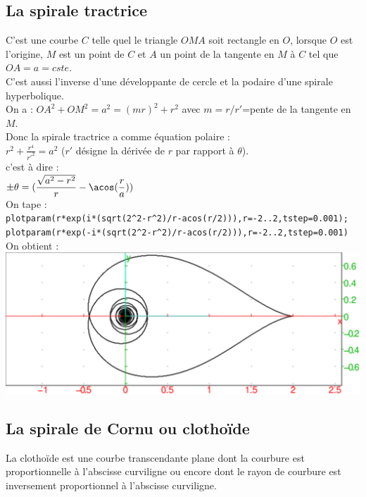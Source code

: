 \documentclass[a4paper,11pt]{book}
\begin{document}
\subsection{La spirale tractrice}
C'est une courbe $C$ telle quel le triangle $OMA$ soit rectangle en $O$,
lorsque $O$ est l'origine, $M$ est un point de $C$ et $A$ un point de la 
tangente en $M$ \`a $C$ tel que $OA=a=cste$.\\ 
C'est aussi l'inverse d'une d\'eveloppante de cercle et la podaire d'une 
spirale hyperbolique.\\
On a : $OA^2+OM^2=a^2=(mr)^2+r^2$ avec $m=r/r'$=pente de la tangente en $M$.\\
Donc la spirale tractrice a  comme \'equation polaire :\\
$\displaystyle r^2+\frac{r^4}{r'^2}=a^2$ ($r'$ d\'esigne la d\'eriv\'ee de $r$ 
par rapport \`a $\theta$).\\
c'est \`a dire :\\
$\displaystyle \pm \theta=(\frac{\sqrt{a^2-r^2}}{r}-\acos(\frac{r}{a})) $\\
On tape :\\
{\tt plotparam(r*exp(i*(sqrt(2\verb|^|2-r\verb|^|2)/r-acos(r/2))),r=-2..2,tstep=0.001);}\\
{\tt plotparam(r*exp(-i*(sqrt(2\verb|^|2-r\verb|^|2)/r-acos(r/2))),r=-2..2,tstep=0.001)}\\
On obtient :\\
\includegraphics[width=\textwidth]{spiral10}
\subsection{La spirale de Cornu ou clotho\"{i}de}
La clotho\"{i}de est une courbe transcendante plane dont la courbure est 
proportionnelle \`a l'abscisse curviligne ou encore dont le rayon de courbure 
est inversement proportionnel \`a l'abscisse curviligne.
\end{document}
